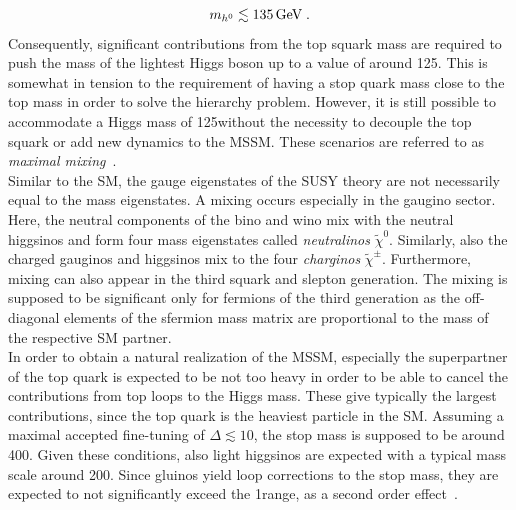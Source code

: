 \begin{equation*}
m_{h^0} \lesssim 135 \,\text{Ge}\kern-0.06667em\text{V} \; .
\end{equation*}
Consequently, significant contributions from the top squark mass are required to push the mass of the lightest Higgs boson up to a value of around 125\gev. This is somewhat in tension to the requirement of having a stop quark mass close to the top mass in order to solve the hierarchy problem. However, it is still possible to accommodate a Higgs mass of 125\gev without the necessity to decouple the top squark or add new dynamics to the MSSM. These scenarios are referred to as \textit{maximal mixing}~\cite{Djouadi:2005gj}. \\
Similar to the SM, the gauge eigenstates of the SUSY theory are not necessarily equal to the mass eigenstates. A mixing occurs especially in the gaugino sector. Here, the neutral components of the bino and wino mix with the neutral higgsinos and form four mass eigenstates called \textit{neutralinos} $\tilde{\chi}^0$. Similarly, also the charged gauginos and higgsinos mix to the four \textit{charginos} $\tilde{\chi}^{\pm}$. Furthermore, mixing can also appear in the third squark and slepton generation. The mixing is supposed to be significant only for fermions of the third generation as the off-diagonal elements of the sfermion mass matrix are proportional to the mass of the respective SM partner. \\
In order to obtain a natural realization of the MSSM, especially the superpartner of the top quark is expected to be not too heavy in order to be able to cancel the contributions from top loops to the Higgs mass. These give typically the largest contributions, since the top quark is the heaviest particle in the SM. Assuming a maximal accepted fine-tuning of $\Delta \lesssim 10$, the stop mass is supposed to be around 400\gev. Given these conditions, also light higgsinos are expected with a typical mass scale around 200\gev. Since gluinos yield loop corrections to the stop mass, they are expected to not significantly exceed the 1\tev range, as a second order effect~\cite{Craig:2013cxa}. 

